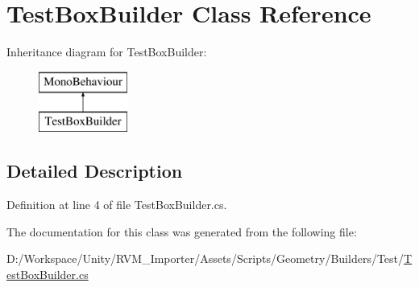 \hypertarget{class_test_box_builder}{}\section{Test\+Box\+Builder Class Reference}
\label{class_test_box_builder}
Inheritance diagram for Test\+Box\+Builder\+:\begin{figure}[H]
\begin{center}
\leavevmode
\includegraphics[height=2.000000cm]{class_test_box_builder}
\end{center}
\end{figure}


\subsection{Detailed Description}


Definition at line 4 of file Test\+Box\+Builder.\+cs.



The documentation for this class was generated from the following file\+:\begin{DoxyCompactItemize}
\item 
D\+:/\+Workspace/\+Unity/\+R\+V\+M\+\_\+\+Importer/\+Assets/\+Scripts/\+Geometry/\+Builders/\+Test/\mbox{\hyperlink{_test_box_builder_8cs}{Test\+Box\+Builder.\+cs}}\end{DoxyCompactItemize}

